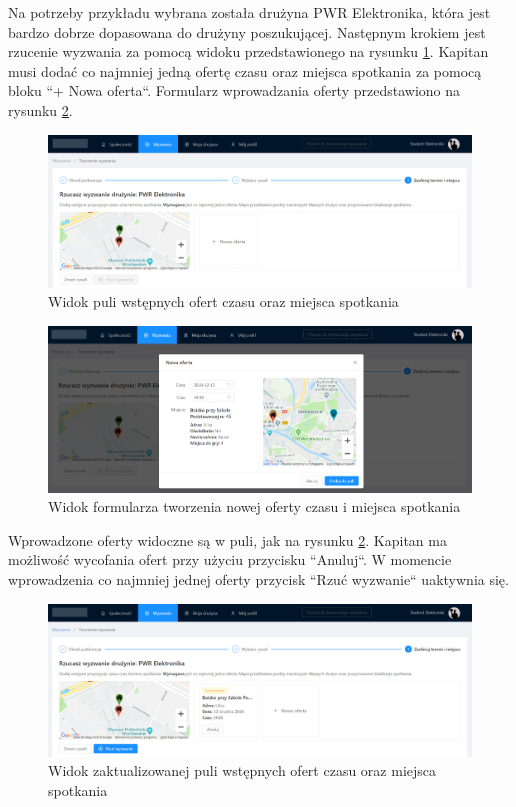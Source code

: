 Na potrzeby przykładu wybrana została drużyna PWR Elektronika, która jest bardzo dobrze dopasowana do drużyny poszukującej. Następnym krokiem jest rzucenie wyzwania za pomocą widoku przedstawionego na rysunku \ref{fig:ss-search-5}. Kapitan musi dodać co najmniej jedną ofertę czasu oraz miejsca spotkania za pomocą bloku ``+ Nowa oferta``. Formularz wprowadzania oferty przedstawiono na rysunku \ref{fig:ss-search-6}.

\begin{figure}[H]
\centering
\includegraphics[width=\linewidth]{065-dzialanie/rys/ss-search-5.PNG}
\caption{Widok puli wstępnych ofert czasu oraz miejsca spotkania}
\label{fig:ss-search-5}
\end{figure}


\begin{figure}[H]
\centering
\includegraphics[width=\linewidth]{065-dzialanie/rys/ss-search-6.PNG}
\caption{Widok formularza tworzenia nowej oferty czasu i miejsca spotkania}
\label{fig:ss-search-6}
\end{figure}

Wprowadzone oferty widoczne są w puli, jak na rysunku \ref{fig:ss-search-6}. Kapitan ma możliwość wycofania ofert przy użyciu przycisku ``Anuluj``. W momencie wprowadzenia co najmniej jednej oferty przycisk ``Rzuć wyzwanie`` uaktywnia się.


\begin{figure}[H]
\centering
\includegraphics[width=\linewidth]{065-dzialanie/rys/ss-search-7.PNG}
\caption{Widok zaktualizowanej puli wstępnych ofert czasu oraz miejsca spotkania}
\label{fig:ss-search-7}
\end{figure}


